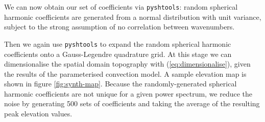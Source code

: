 \documentclass[trackchanges]{aastex63}
\newcommand{\jr}[1]{\textit{\textcolor{blue}{{#1}}}}
\begin{document}
We can now obtain our set of coefficients via {\tt pyshtools}: %
random spherical harmonic coefficients are generated from a normal distribution with unit variance, subject to the strong assumption of no correlation between wavenumbers. 



Then we again use {\tt pyshtools} to expand the random spherical harmonic coefficients onto a Gauss-Legendre quadrature grid.
At this stage we can dimensionalise the spatial domain topography with (\ref{eq:dimensionalise}), given the results of the parameterised convection model. A sample elevation map is shown in figure \ref{fig:synth-map}. %
Because the randomly-generated spherical harmonic coefficients are not unique for a given power spectrum, we reduce the noise by generating 500 sets of coefficients and taking the average of the resulting peak elevation values.
\end{document}

